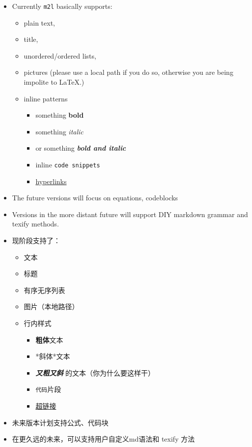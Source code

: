 \documentclass{ctexart}
\begin{document}
	\begin{itemize}
		\item Currently \texttt{m2l} basically supports:
		\begin{itemize}
			\item plain text,
			\item title,
			\item unordered/ordered lists,
			\item pictures (please use a local path if you do so, otherwise you are being impolite to LaTeX.)
			\item inline patterns
			\begin{itemize}
				\item something \textbf{bold}
				\item something \textit{italic}
				\item or something \textbf{\textit{bold and italic}}
				\item inline \texttt{code snippets}
				\item \href{https://http.cat/404}{hyperlinks}
			\end{itemize}
		\end{itemize}
		\item The future versions will focus on equations, codeblocks
		\item Versions in the more distant future will support DIY markdown grammar and texify methods.
	\end{itemize}

	\begin{itemize}
		\item 现阶段支持了：
		\begin{itemize}
			\item 文本
			\item 标题
			\item 有序无序列表
			\item 图片（本地路径）
			\item 行内样式
			\begin{itemize}
				\item \textbf{粗体}文本
				\item *斜体*文本
				\item \textbf{\textit{又粗又斜}} 的文本（你为什么要这样干）
				\item \texttt{代码}片段
				\item \href{https://http.cat/404}{超链接}
			\end{itemize}
		\end{itemize}
		\item 未来版本计划支持公式、代码块
		\item 在更久远的未来，可以支持用户自定义md语法和 texify 方法
	\end{itemize}
\end{document}
